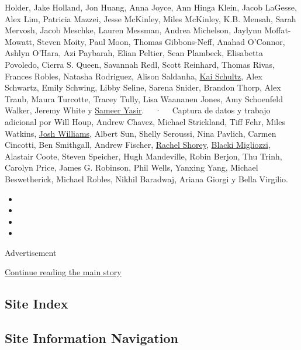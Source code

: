 Holder, Jake Holland, Jon Huang, Anna Joyce, Ann Hinga Klein, Jacob
LaGesse, Alex Lim, Patricia Mazzei, Jesse McKinley, Miles McKinley, K.B.
Mensah, Sarah Mervosh, Jacob Meschke, Lauren Messman, Andrea Michelson,
Jaylynn Moffat-Mowatt, Steven Moity, Paul Moon, Thomas Gibbons-Neff,
Anahad O'Connor, Ashlyn O'Hara, Azi Paybarah, Elian Peltier, Sean
Plambeck, Elisabetta Povoledo, Cierra S. Queen, Savannah Redl, Scott
Reinhard, Thomas Rivas, Frances Robles, Natasha Rodriguez, Alison
Saldanha, \href{https://www.nytimes3xbfgragh.onion/by/kai-schultz}{Kai
Schultz}, Alex Schwartz, Emily Schwing, Libby Seline, Sarena Snider,
Brandon Thorp, Alex Traub, Maura Turcotte, Tracey Tully, Lisa Waananen
Jones, Amy Schoenfeld Walker, Jeremy White y
\href{https://www.nytimes3xbfgragh.onion/by/sameer-yasir}{Sameer Yasir}.
~~·~~ Captura de datos y trabajo adicional por Will Houp, Andrew Chavez,
Michael Strickland, Tiff Fehr, Miles Watkins,
\href{https://www.nytimes3xbfgragh.onion/by/josh-williams}{Josh
Williams}, Albert Sun, Shelly Seroussi, Nina Pavlich, Carmen Cincotti,
Ben Smithgall, Andrew Fischer,
\href{https://www.nytimes3xbfgragh.onion/by/rachel-shorey}{Rachel
Shorey},
\href{https://www.nytimes3xbfgragh.onion/by/blacki-migliozzi}{Blacki
Migliozzi}, Alastair Coote, Steven Speicher, Hugh Mandeville, Robin
Berjon, Thu Trinh, Carolyn Price, James G. Robinson, Phil Wells, Yanxing
Yang, Michael Beswetherick, Michael Robles, Nikhil Baradwaj, Ariana
Giorgi y Bella Virgilio.

\begin{itemize}
\item
\item
\item
\item
\end{itemize}

Advertisement

\protect\hyperlink{after-bottom}{Continue reading the main story}

\hypertarget{site-index}{%
\subsection{Site Index}\label{site-index}}

\hypertarget{site-information-navigation}{%
\subsection{Site Information
Navigation}\label{site-information-navigation}}

